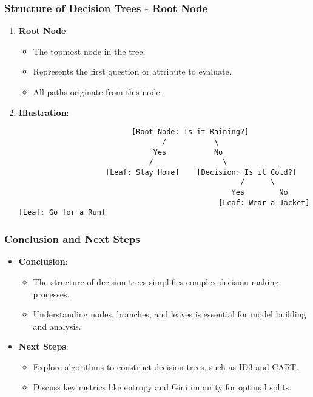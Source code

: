 \documentclass{beamer}
\begin{document}
\begin{frame}[fragile]
    \frametitle{Structure of Decision Trees - Root Node}
    \begin{enumerate}
        \item \textbf{Root Node}:
            \begin{itemize}
                \item The topmost node in the tree.
                \item Represents the first question or attribute to evaluate.
                \item All paths originate from this node.
            \end{itemize}
        \item \textbf{Illustration}:
        \begin{center}
            \begin{verbatim}
                          [Root Node: Is it Raining?]
                                 /           \
                               Yes           No
                              /                \
                    [Leaf: Stay Home]    [Decision: Is it Cold?]
                                                   /      \
                                                 Yes        No
                                              [Leaf: Wear a Jacket] [Leaf: Go for a Run]
            \end{verbatim}
        \end{center}
    \end{enumerate}
\end{frame}

\begin{frame}[fragile]
    \frametitle{Conclusion and Next Steps}
    \begin{itemize}
        \item \textbf{Conclusion}:
            \begin{itemize}
                \item The structure of decision trees simplifies complex decision-making processes.
                \item Understanding nodes, branches, and leaves is essential for model building and analysis.
            \end{itemize}
        \item \textbf{Next Steps}:
            \begin{itemize}
                \item Explore algorithms to construct decision trees, such as ID3 and CART.
                \item Discuss key metrics like entropy and Gini impurity for optimal splits.
            \end{itemize}
    \end{itemize}
\end{frame}
\end{document}
